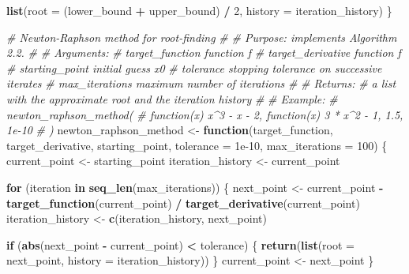 \documentclass[
]{article}
\newenvironment{Shaded}{\begin{snugshade}}{\end{snugshade}}
\newcommand{\AttributeTok}[1]{\textcolor[rgb]{0.13,0.29,0.53}{#1}}
\newcommand{\CommentTok}[1]{\textcolor[rgb]{0.56,0.35,0.01}{\textit{#1}}}
\newcommand{\ControlFlowTok}[1]{\textcolor[rgb]{0.13,0.29,0.53}{\textbf{#1}}}
\newcommand{\DecValTok}[1]{\textcolor[rgb]{0.00,0.00,0.81}{#1}}
\newcommand{\FloatTok}[1]{\textcolor[rgb]{0.00,0.00,0.81}{#1}}
\newcommand{\FunctionTok}[1]{\textcolor[rgb]{0.13,0.29,0.53}{\textbf{#1}}}
\newcommand{\NormalTok}[1]{#1}
\newcommand{\OtherTok}[1]{\textcolor[rgb]{0.56,0.35,0.01}{#1}}
\newcommand{\SpecialCharTok}[1]{\textcolor[rgb]{0.81,0.36,0.00}{\textbf{#1}}}
\begin{document}
\begin{Shaded}
\begin{Highlighting}[]
  \FunctionTok{list}\NormalTok{(}\AttributeTok{root =}\NormalTok{ (lower\_bound }\SpecialCharTok{+}\NormalTok{ upper\_bound) }\SpecialCharTok{/} \DecValTok{2}\NormalTok{, }\AttributeTok{history =}\NormalTok{ iteration\_history)}
\NormalTok{\}}

\CommentTok{\#\textquotesingle{} Newton{-}Raphson method for root{-}finding}
\CommentTok{\#\textquotesingle{}}
\CommentTok{\#\textquotesingle{} Purpose: implements Algorithm 2.2.}
\CommentTok{\#\textquotesingle{}}
\CommentTok{\#\textquotesingle{} Arguments:}
\CommentTok{\#\textquotesingle{}   target\_function     function f}
\CommentTok{\#\textquotesingle{}   target\_derivative   function f\textquotesingle{}}
\CommentTok{\#\textquotesingle{}   starting\_point      initial guess x0}
\CommentTok{\#\textquotesingle{}   tolerance           stopping tolerance on successive iterates}
\CommentTok{\#\textquotesingle{}   max\_iterations      maximum number of iterations}
\CommentTok{\#\textquotesingle{}}
\CommentTok{\#\textquotesingle{} Returns:}
\CommentTok{\#\textquotesingle{}   a list with the approximate root and the iteration history}
\CommentTok{\#\textquotesingle{}}
\CommentTok{\#\textquotesingle{} Example:}
\CommentTok{\#\textquotesingle{}   newton\_raphson\_method(}
\CommentTok{\#\textquotesingle{}     function(x) x\^{}3 {-} x {-} 2, function(x) 3 * x\^{}2 {-} 1, 1.5, 1e{-}10}
\CommentTok{\#\textquotesingle{}   )}
\NormalTok{newton\_raphson\_method }\OtherTok{\textless{}{-}} \ControlFlowTok{function}\NormalTok{(target\_function, target\_derivative, starting\_point,}
                                   \AttributeTok{tolerance =} \FloatTok{1e{-}10}\NormalTok{, }\AttributeTok{max\_iterations =} \DecValTok{100}\NormalTok{) \{}
\NormalTok{  current\_point }\OtherTok{\textless{}{-}}\NormalTok{ starting\_point}
\NormalTok{  iteration\_history }\OtherTok{\textless{}{-}}\NormalTok{ current\_point}

  \ControlFlowTok{for}\NormalTok{ (iteration }\ControlFlowTok{in} \FunctionTok{seq\_len}\NormalTok{(max\_iterations)) \{}
\NormalTok{    next\_point }\OtherTok{\textless{}{-}}\NormalTok{ current\_point }\SpecialCharTok{{-}} \FunctionTok{target\_function}\NormalTok{(current\_point) }\SpecialCharTok{/} \FunctionTok{target\_derivative}\NormalTok{(current\_point)}
\NormalTok{    iteration\_history }\OtherTok{\textless{}{-}} \FunctionTok{c}\NormalTok{(iteration\_history, next\_point)}

    \ControlFlowTok{if}\NormalTok{ (}\FunctionTok{abs}\NormalTok{(next\_point }\SpecialCharTok{{-}}\NormalTok{ current\_point) }\SpecialCharTok{\textless{}}\NormalTok{ tolerance) \{}
      \FunctionTok{return}\NormalTok{(}\FunctionTok{list}\NormalTok{(}\AttributeTok{root =}\NormalTok{ next\_point, }\AttributeTok{history =}\NormalTok{ iteration\_history))}
\NormalTok{    \}}
\NormalTok{    current\_point }\OtherTok{\textless{}{-}}\NormalTok{ next\_point}
\NormalTok{  \}}


\end{Highlighting}
\end{Shaded}
\end{document}
